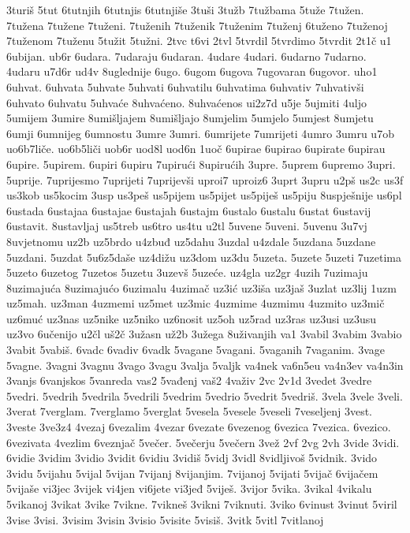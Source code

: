 {3turiš
5tut
6tutnjih
6tutnjis
6tutnjiše
3tuši
3tužb
7tužbama
5tuže
7tužen.
7tužena
7tužene
7tuženi.
7tuženih
7tuženik
7tuženim
7tuženj
6tuženo
7tuženoj
7tuženom
7tuženu
5tužit
5tužni.
2tvc
t6vi
2tvl
5tvrdil
5tvrdimo
5tvrdit
2t1č
u1
6ubijan.
ub6r
6udara.
7udaraju
6udaran.
4udare
4udari.
6udarno
7udarno.
4udaru
u7d6r
ud4v
8uglednije
6ugo.
6ugom
6ugova
7ugovaran
6ugovor.
uho1
6uhvat.
6uhvata
5uhvate
5uhvati
6uhvatilu
6uhvatima
6uhvativ
7uhvativši
6uhvato
6uhvatu
5uhvaće
8uhvaćeno.
8uhvaćenos
ui2z7d
u5je
5ujmiti
4uljo
5umijem
3umire
8umišljajem
8umišljajo
8umjelim
5umjelo
5umjest
8umjetu
6umji
6umnijeg
6umnostu
3umre
3umri.
6umrijete
7umrijeti
4umro
3umru
u7ob
uo6b7liče.
uo6b5liči
uob6r
uod8l
uod6n
1uoč
6upirae
6upirao
6upirate
6upirau
6upire.
5upirem.
6upiri
6upiru
7upirući
8upirućih
3upre.
5uprem
6upremo
3upri.
5uprije.
7uprijesmo
7uprijeti
7uprijevši
uproi7
uproiz6
3uprt
3upru
u2pš
us2c
us3f
us3kob
us5kocim
3usp
us3peš
us5pijem
us5pijet
us5piješ
us5piju
8uspješnije
us6pl
6ustada
6ustajaa
6ustajae
6ustajah
6ustajm
6ustalo
6ustalu
6ustat
6ustavij
6ustavit.
8ustavljaj
us5treb
us6tro
us4tu
u2tl
5uvene
5uveni.
5uvenu
3u7vj
8uvjetnomu
uz2b
uz5brdo
u4zbuđ
uz5dahu
3uzdal
u4zdale
5uzdana
5uzdane
5uzdani.
5uzdat
5u6z5daše
uz4dižu
uz3dom
uz3du
5uzeta.
5uzete
5uzeti
7uzetima
5uzeto
6uzetog
7uzetos
5uzetu
3uzevš
5uzeće.
uz4gla
uz2gr
4uzih
7uzimaju
8uzimajuća
8uzimajućo
6uzimalu
4uzimač
uz3ić
uz3iša
uz3jaš
3uzlat
uz3lij
1uzm
uz5mah.
uz3man
4uzmemi
uz5met
uz3mic
4uzmime
4uzmimu
4uzmito
uz3mič
uz6muć
uz3nas
uz5nike
uz5niko
uz6nosit
uz5oh
uz5rad
uz3ras
uz3usi
uz3usu
uz3vo
6učenijo
u2čl
uš2č
3užasn
už2b
3užega
8uživanjih
va1
3vabil
3vabim
3vabio
3vabit
5vabiš.
6vadc
6vadiv
6vadk
5vagane
5vagani.
5vaganih
7vaganim.
3vage
5vagne.
3vagni
3vagnu
3vago
3vagu
3valja
5valjk
va4nek
va6n5eu
va4n3ev
va4n3in
3vanjs
6vanjskos
5vanreda
vas2
5vađenj
vaš2
4važiv
2vc
2v1d
3vedet
3vedre
5vedri.
5vedrih
5vedrila
5vedrili
5vedrim
5vedrio
5vedrit
5vedriš.
3vela
3vele
3veli.
3verat
7verglam.
7verglamo
5verglat
5vesela
5vesele
5veseli
7veseljenj
3vest.
3veste
3ve3z4
4vezaj
6vezalim
4vezar
6vezate
6vezenog
6vezica
7vezica.
6vezico.
6vezivata
4vezlim
6veznjač
5večer.
5večerju
5večern
3vež
2vf
2vg
2vh
3vide
3vidi.
6vidie
3vidim
3vidio
3vidit
6vidiu
3vidiš
5vidj
3vidl
8vidljivoš
5vidnik.
3vido
3vidu
5vijahu
5vijal
5vijan
7vijanj
8vijanjim.
7vijanoj
5vijati
5vijač
6vijačem
5vijaše
vi3jec
3vijek
vi4jen
vi6jete
vi3jeđ
5viješ.
3vijor
5vika.
3vikal
4vikalu
5vikanoj
3vikat
3vike
7vikne.
7vikneš
3vikni
7viknuti.
3viko
6vinust
3vinut
5viril
3vise
3visi.
3visim
3visin
3visio
5visite
5visiš.
3vitk
5vitl
7vitlanoj
}
